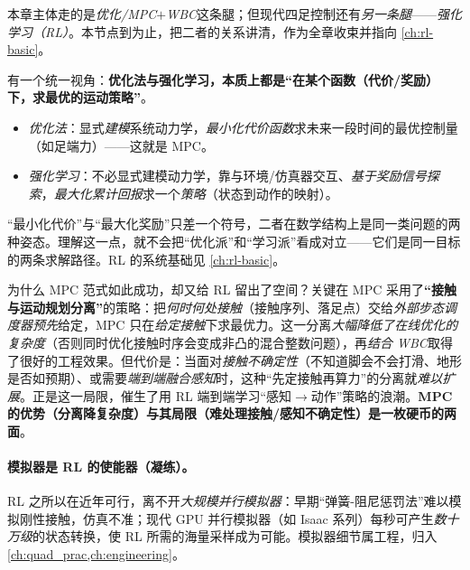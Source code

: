 本章主体走的是\emph{优化/MPC$+$WBC}这条腿；但现代四足控制还有\emph{另一条腿}——\emph{强化学习（RL）}。本节点到为止，把二者的关系讲清，作为全章收束并指向 \cref{ch:rl-basic}。

\begin{insight}\label{ins:qa-two-streams}
有一个统一视角：\textbf{优化法与强化学习，本质上都是“在某个函数（代价/奖励）下，求最优的运动策略”}。
\begin{itemize}
  \item \emph{优化法}：显式\emph{建模}系统动力学，\emph{最小化代价函数}求未来一段时间的最优控制量（如足端力）——这就是 MPC。
  \item \emph{强化学习}：不必显式建模动力学，靠与环境/仿真器交互、\emph{基于奖励信号探索}，\emph{最大化累计回报}求一个\emph{策略}（状态到动作的映射）。
\end{itemize}
“最小化代价”与“最大化奖励”只差一个符号，二者在数学结构上是同一类问题的两种姿态\cite{yu2021quadruped}。理解这一点，就不会把“优化派”和“学习派”看成对立——它们是同一目标的两条求解路径。RL 的系统基础见 \cref{ch:rl-basic}。
\end{insight}

\begin{insight}\label{ins:qa-contact-split}
为什么 MPC 范式如此成功，却又给 RL 留出了空间？关键在 MPC 采用了\textbf{“接触与运动规划分离”}的策略：把\emph{何时何处接触}（接触序列、落足点）交给\emph{外部步态调度器}\emph{预先}给定，MPC 只在\emph{给定接触}下求最优力。这一分离\emph{大幅降低了在线优化的复杂度}（否则同时优化接触时序会变成非凸的混合整数问题），再\emph{结合 WBC}取得了很好的工程效果\cite{yu2021quadruped}。但代价是：当面对\emph{接触不确定性}（不知道脚会不会打滑、地形是否如预期）、或需要\emph{端到端融合感知}时，这种“先定接触再算力”的分离就\emph{难以扩展}。正是这一局限，催生了用 RL 端到端学习“感知$\to$动作”策略的浪潮。\textbf{MPC 的优势（分离降复杂度）与其局限（难处理接触/感知不确定性）是一枚硬币的两面}。
\end{insight}

\paragraph{模拟器是 RL 的使能器（凝练）。}
RL 之所以在近年可行，离不开\emph{大规模并行模拟器}：早期“弹簧-阻尼惩罚法”难以模拟刚性接触，仿真不准；现代 GPU 并行模拟器（如 Isaac 系列）每秒可产生\emph{数十万级}的状态转换，使 RL 所需的海量采样成为可能\cite{yu2021quadruped}。模拟器细节属工程，归入 \cref{ch:quad_prac,ch:engineering}。

